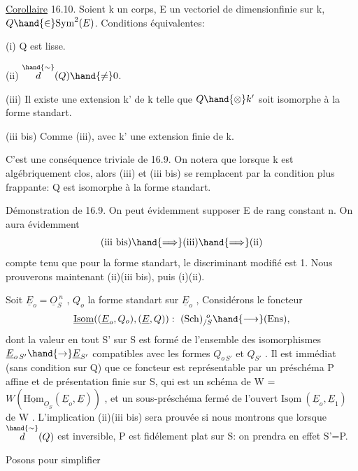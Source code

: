 \uline{Corollaire} 16.10. Soient k un corps, E un vectoriel de dimensionfinie
sur k, $Q \hand{\in} \mathrm{Sym}^2(E)$. Conditions équivalentes:

(i) Q est lisse.

(ii) $\overset{\hand{\sim}}{d}(Q) \hand{\neq} 0$.

(iii) Il existe une extension  k' de k telle que $Q\hand{\otimes} k'$ soit
isomorphe à la forme standart.

(iii bis) Comme (iii), avec k' une extension finie de k.

C'est une conséquence triviale de 16.9. On notera que lorsque k est
algébriquement clos, alors (iii) et (iii bis) se remplacent par la
condition plus frappante: Q est isomorphe à la forme standart.

Démonstration de 16.9. On  peut évidemment
supposer E de rang constant n. On aura évidemment
\[ \text{(iii bis)} \hand{\Longrightarrow} \text{(iii)} \hand{\Longrightarrow} \text{(ii)} \]
compte tenu que pour la forme standart, le discriminant modifié est 1.
Nous prouverons maintenant (ii)\hand{$\Longrightarrow$}(iii bis), puis (i)\hand{$\Longleftrightarrow$}(ii).

Soit $\underline{E}_o = \underline{O}_S^{\ n}$ , $Q_o$ la forme standart sur $\underline{E}_o$ , Considérons le
foncteur
\[ \underline{\mathrm{Isom}}( (\underline{E}_o,Q_o),(\underline{E},Q)) :\ (\mathrm{Sch})_{/S}^{\ o} \hand{\longrightarrow} (\mathrm{Ens}) , \]
dont la valeur en tout S' sur S est formé de l'ensemble des isomorphismes
$\underline{E}_{o\,S'} \hand{\to} \underline{E}_{S'}$ compatibles avec les formes $Q_{o\,S'}$ et $Q_{S'}$ . Il est immédiat
(sans condition sur  Q) que ce foncteur est représentable par un préschéma
P affine et de présentation finie sur S, qui est un schéma de W =
$W(\underline{\mathrm{Hom}}_{\underline{O}_S}(\underline{E}_o,\underline{E}))$ , et un sous-préschéma fermé de  l'ouvert
$\underline{\mathrm{Isom}}\ (\underline{E}_o,\underline{E}_1)$ de W \hand{/}. L'implication (ii)\hand{$\Longrightarrow$}(iii bis) sera prouvée si
nous montrons que lorsque $\overset{\hand{\sim}}{d}(Q)$ est inversible, P est fidélement plat
sur S: on prendra en effet S'=P.

Posons pour simplifier 

